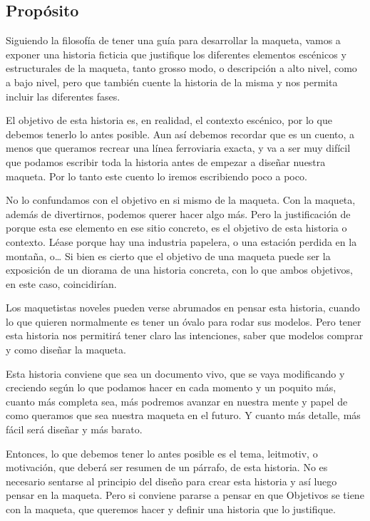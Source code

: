 \subsection{Propósito}

Siguiendo la filosofía de tener una guía para desarrollar la maqueta, vamos a exponer
una historia ficticia que justifique los diferentes elementos escénicos y estructurales
de la maqueta, tanto grosso modo, o descripción a alto nivel, como a bajo nivel, pero
que también cuente la historia de la misma y nos permita incluir las diferentes fases. 

El objetivo de esta historia es, en realidad, el contexto escénico, por lo que debemos
tenerlo lo antes posible. Aun así debemos recordar que es un cuento, a menos que queramos
recrear una línea ferroviaria exacta, y va a ser muy difícil que podamos escribir toda la
historia antes de empezar a diseñar nuestra maqueta. Por lo tanto este cuento lo iremos
escribiendo poco a poco. 
 
No lo confundamos con el objetivo en si mismo de la maqueta. Con la maqueta, además de
divertirnos, podemos querer hacer algo más. Pero la justificación de porque esta ese
elemento en ese sitio concreto, es el objetivo de esta historia o contexto. Léase porque
hay una industria papelera, o una estación perdida en la montaña, o… Si bien es cierto
que el objetivo de una maqueta puede ser la exposición de un diorama de una historia
concreta, con lo que ambos objetivos, en este caso, coincidirían. 
 
Los maquetistas noveles pueden verse abrumados en pensar esta historia, cuando lo que
quieren normalmente es tener un óvalo para rodar sus modelos. Pero tener esta historia
nos permitirá tener claro las intenciones, saber que modelos comprar y como diseñar
la maqueta.  
 
Esta historia conviene que sea un documento vivo, que se vaya modificando y creciendo
según lo que podamos hacer en cada momento y un poquito más, cuanto más completa sea,
más podremos avanzar en nuestra mente y papel de como queramos que sea nuestra maqueta
en el futuro. Y cuanto más detalle, más fácil será diseñar y más barato. 
 
Entonces, lo que debemos tener lo antes posible es el tema, leitmotiv, o motivación,
que deberá ser resumen de un párrafo, de esta historia.  No es necesario sentarse al
principio del diseño para crear esta historia y así luego pensar en la maqueta. Pero si
conviene pararse a pensar en que Objetivos se tiene con la maqueta, que queremos hacer
y definir una historia que lo justifique. 

